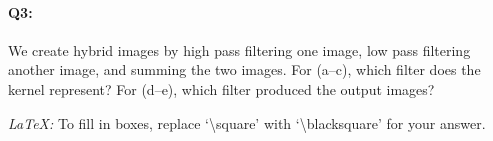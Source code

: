 



\pagebreak
\paragraph{Q3:} We create hybrid images by high pass filtering one image, low pass filtering another image, and summing the two images. For (a--c), which filter does the kernel represent? For (d--e), which filter produced the output images?

\emph{LaTeX:} To fill in boxes, replace `\textbackslash square' with `\textbackslash blacksquare' for your answer.


